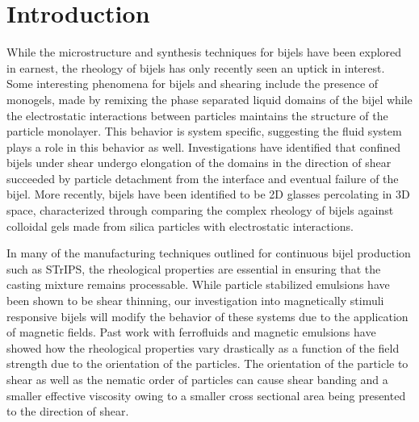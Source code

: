 
\section{Introduction}

While the microstructure and synthesis techniques for bijels have been explored in earnest, the rheology of bijels
has only recently seen an uptick in interest. Some interesting phenomena for bijels and shearing include the 
presence of monogels, made by remixing the phase separated liquid domains of the bijel while the electrostatic
interactions between particles maintains the structure of the particle monolayer. \cite{sanz_colloidal_2009} 
This behavior is system specific, suggesting the fluid system plays a role in this behavior as well. \cite{tavacoli_novel_2011}
\cite{bai_dynamics_2015} Investigations have identified that confined bijels under shear undergo elongation of
the domains in the direction of shear succeeded by particle detachment from the interface and eventual failure of the bijel. \cite{bonaccorso_shear_2020}
More recently, bijels have been identified to be 2D glasses percolating in 3D space, characterized through comparing the complex rheology of bijels against
colloidal gels made from silica particles with electrostatic interactions. \cite{ching_bijel_2022} 

In many of the manufacturing techniques outlined for continuous bijel production such as STrIPS, the rheological properties are essential in ensuring that 
the casting mixture remains processable. \cite{haase_continuous_2015,haase_situ_2016} While particle stabilized emulsions have been shown to be shear thinning, 
our investigation into magnetically stimuli responsive bijels will modify the behavior of these systems due to the application of magnetic fields. Past work with 
ferrofluids and magnetic emulsions have showed how the rheological properties vary drastically as a function of the field strength due to the orientation of the 
particles. \cite{qiao_magnetorheological_2012} The orientation of the particle to shear as well as the nematic order of particles 
can cause shear banding and a smaller effective viscosity owing to a smaller cross sectional area being presented to the direction of shear. 

